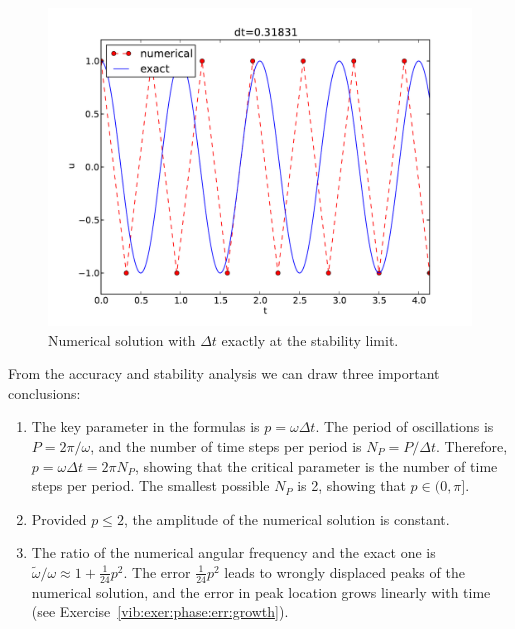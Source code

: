 \documentclass[%
oneside,                 %
final,                   %
10pt]{article}
\newenvironment{summary_mdfboxadmon}[1][]{
\begin{summary_mdfboxmdframed}[frametitle=#1]
}
{
\end{summary_mdfboxmdframed}
}
\begin{document}
\begin{figure}[!ht]  %
  \centerline{\includegraphics[width=0.9\linewidth]{fig-vib/vib_stability_limit.pdf}}
  \caption{
  Numerical solution with $\Delta t$ exactly at the stability limit. \label{vib:ode1:dt:stablimit}
  }
\end{figure}





\begin{summary_mdfboxadmon}[Summary.]
From the accuracy and stability
analysis we can draw three important conclusions:

\begin{enumerate}
\item The key parameter in the formulas is $p=\omega\Delta t$.
   The period of oscillations is $P=2\pi/\omega$, and the
   number of time steps per period is $N_P=P/\Delta t$.
   Therefore, $p=\omega\Delta t = 2\pi N_P$, showing that the
   critical parameter is the number of time steps per period.
   The smallest possible $N_P$ is 2, showing that $p\in (0,\pi]$.

\item Provided $p\leq 2$, the amplitude of the numerical solution is
   constant.

\item The ratio of the numerical angular frequency and the exact
   one is
   $\tilde\omega/\omega \approx 1 + \frac{1}{24}p^2$.
   The error $\frac{1}{24}p^2$ leads to wrongly displaced peaks of the numerical
   solution, and the error in peak location grows linearly with time
   (see Exercise~\ref{vib:exer:phase:err:growth}).
\end{enumerate}

\noindent
\end{summary_mdfboxadmon}
\end{document}
